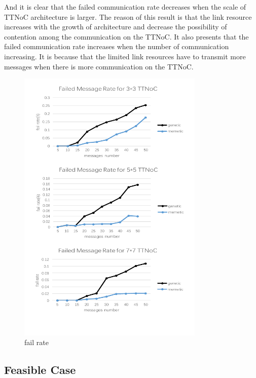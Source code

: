 \documentclass[conference]{IEEEtran}
\begin{document}
And it is clear that the failed communication rate decreases when the scale of TTNoC architecture is larger. The reason of this result is that the link resource increases with the growth of architecture and decrease the possibility of contention among the communication on the TTNoC. It also presents that the failed communication rate increases when the number of communication increasing. It is because that the limited link resources have to transmit more messages when there is more communication on the TTNoC.
\begin{figure}[!t]
	\centering
	\includegraphics[width=3.5in]{picture/rate}
	\caption{fail rate}
	\label{f:fail}
\end{figure}

\subsection{Feasible Case}
\end{document}
